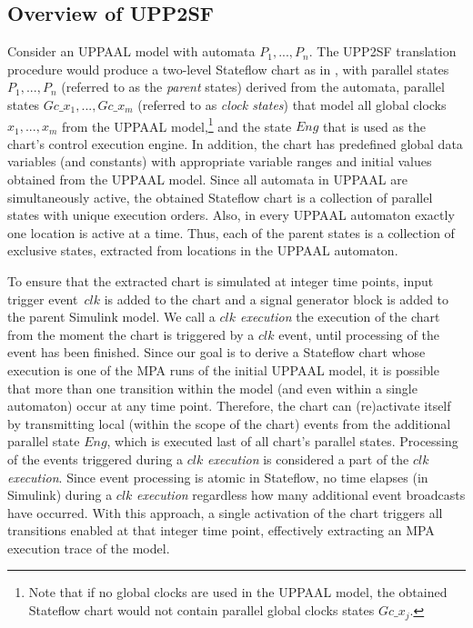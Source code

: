 \subsection{Overview of UPP2SF}
Consider an UPPAAL model with automata $P_1,...,P_n$. The UPP2SF translation procedure would produce a two-level Stateflow chart as in , with parallel states $P_1,...,P_n$ (referred to as the \textit{parent} states) derived from the automata, parallel states $Gc\_{x_1},..., Gc\_{x_m}$ (referred to as \textit{clock states}) that model all global clocks $x_1,...,x_m$ from the UPPAAL model,\footnote{Note that if no global clocks are used in the UPPAAL model, the obtained Stateflow chart would not contain parallel global clocks states $Gc\_x_j$.}  and the state $Eng$ that is used as the chart's control execution engine.
In addition, the chart has predefined global data variables (and constants) with appropriate variable ranges and initial values obtained from the UPPAAL model. 
Since all automata in UPPAAL are simultaneously active, the obtained Stateflow chart is a collection of parallel states with unique execution orders. Also, in every UPPAAL automaton exactly one location is active at a time. Thus, each of the parent states is a collection of exclusive states, extracted from locations in the UPPAAL automaton.


To ensure that the extracted chart is simulated at integer time points, input trigger event~$clk$ is added to the chart and a signal generator block is added to the parent Simulink model. We call a \textit{$clk$ execution} the execution of the chart from the moment the chart is triggered by a $clk$ event, until processing of the event has been finished. Since our goal is to derive a Stateflow chart whose execution is one of the MPA runs of the initial UPPAAL model, it is possible that  more than one transition within the model (and even within a single automaton) occur at any time point. Therefore, the chart can (re)activate itself by transmitting local (within the scope of the chart) events from the additional parallel state $Eng$, which is executed last of all chart's parallel states. Processing of the events triggered during a $clk$ \textit{execution} is considered a part of the $clk$ \textit{execution}. Since event processing is atomic in Stateflow, no time elapses (in Simulink) during a $clk$ \textit{execution} regardless how many additional event broadcasts have occurred. With this approach, a single activation of the chart triggers all transitions enabled at that integer time point, effectively extracting an MPA execution trace of the model. 


